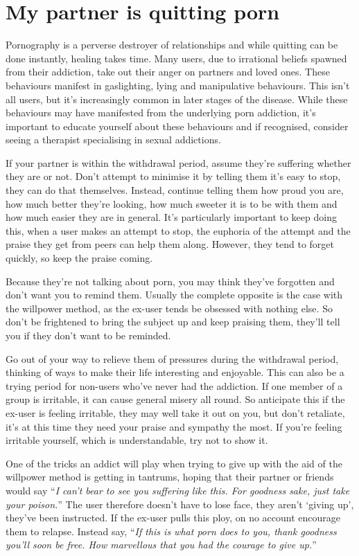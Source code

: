 \documentclass[
]{book}
\begin{document}
\hypertarget{my-partner-is-quitting-porn}{%
\section{My partner is quitting porn}\label{my-partner-is-quitting-porn}}

Pornography is a perverse destroyer of relationships and while quitting can be done instantly, healing takes time. Many users, due to irrational beliefs spawned from their addiction, take out their anger on partners and loved ones. These behaviours manifest in gaslighting, lying and manipulative behaviours. This isn't all users, but it's increasingly common in later stages of the disease. While these behaviours may have manifested from the underlying porn addiction, it's important to educate yourself about these behaviours and if recognised, consider seeing a therapist specialising in sexual addictions.

If your partner is within the withdrawal period, assume they're suffering whether they are or not. Don't attempt to minimise it by telling them it's easy to stop, they can do that themselves. Instead, continue telling them how proud you are, how much better they're looking, how much sweeter it is to be with them and how much easier they are in general. It's particularly important to keep doing this, when a user makes an attempt to stop, the euphoria of the attempt and the praise they get from peers can help them along. However, they tend to forget quickly, so keep the praise coming.

Because they're not talking about porn, you may think they've forgotten and don't want you to remind them. Usually the complete opposite is the case with the willpower method, as the ex-user tends be obsessed with nothing else. So don't be frightened to bring the subject up and keep praising them, they'll tell you if they don't want to be reminded.

Go out of your way to relieve them of pressures during the withdrawal period, thinking of ways to make their life interesting and enjoyable. This can also be a trying period for non-users who've never had the addiction. If one member of a group is irritable, it can cause general misery all round. So anticipate this if the ex-user is feeling irritable, they may well take it out on you, but don't retaliate, it's at this time they need your praise and sympathy the most. If you're feeling irritable yourself, which is understandable, try not to show it.

One of the tricks an addict will play when trying to give up with the aid of the willpower method is getting in tantrums, hoping that their partner or friends would say ``\emph{I can't bear to see you suffering like this. For goodness sake, just take your poison.}'' The user therefore doesn't have to lose face, they aren't `giving up', they've been instructed. If the ex-user pulls this ploy, on no account encourage them to relapse. Instead say, ``\emph{If this is what porn does to you, thank goodness you'll soon be free. How marvellous that you had the courage to give up.}''
\end{document}
